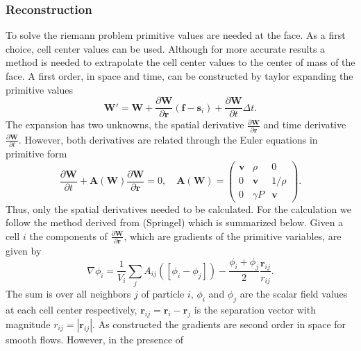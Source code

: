 \subsubsection{Reconstruction}
To solve the riemann problem primitive values are needed at the face. As a first
choice, cell center values can be used. Although for more accurate results a 
method is needed to extrapolate the cell center values to the center of mass of 
the face. A first order, in space and time, can be constructed by taylor 
expanding the primitive values
%
\begin{equation}
	\label{eq.taylor}
	\mathbf{W}' = \mathbf{W} + \frac{\partial\mathbf{W}}{\partial\mathbf{r}}
    	(\mathbf{f}-\mathbf{s}_i) + \frac{\partial\mathbf{W}}
        {\partial t}{\Delta t}.
\end{equation}
%
The expansion has two unknowns, the spatial derivative
$\frac{\partial\mathbf{W}}{\partial \mathbf{r}}$ and time derivative
$\frac{\partial\mathbf{W}}{\partial t}$. However, both derivatives
are related through the Euler equations in primitive form
%
\begin{equation}
    \frac{\partial\mathbf{W}}{\partial t}  + \mathbf{A}
    	(\mathbf{W})\frac{\partial\mathbf{W}}{\partial\mathbf{r}} = 0,
    \quad
    \mathbf{A}(\mathbf{W}) =
    \left(
    \begin{array}{ccc}
        \mathbf{v} & \rho & 0 \\
        0 & \mathbf{v} & 1/\rho \\
        0 & \gamma P & \mathbf{v}
    \end{array}
    \right).
\end{equation}
%
Thus, only the spatial derivatives needed to be calculated. For the
calculation we follow the method derived from (Springel) which is
summarized below. Given a cell $i$ the components of 
$\frac{\partial\mathbf{W}}{\partial \mathbf{r}}$, which are gradients
of the primitive variables, are given by
%
\begin{equation}
	\nabla\phi_i = \frac{1}{V_i}\sum_{j}A_{ij}
    	\left(\left[\phi_i - \phi_j\right]\right) -
        \frac{\phi_i + \phi_j}{2}
        \frac{\mathbf{r}_{ij}}{r_{ij}}.
\end{equation}
%
The sum is over all neighbors $j$ of particle $i$, $\phi_i$ and
$\phi_j$ are the scalar field values at each cell center respectively,
$\mathbf{r}_{ij} = \mathbf{r}_i - \mathbf{r}_j$ is the separation vector
with magnitude $r_{ij} =|\mathbf{r}_{ij}|$. As constructed the gradients
are second order in space for smooth flows. However, in the presence of
